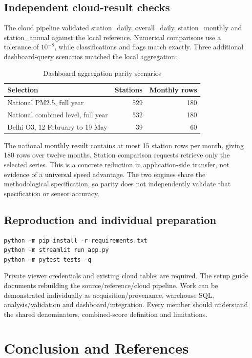 \documentclass[11pt,a4paper]{article}
\begin{document}
\subsection{Independent cloud-result checks}
The cloud pipeline validated station\_daily, overall\_daily, station\_monthly and station\_annual against the local reference. Numerical comparisons use a tolerance of $10^{-8}$, while classifications and flags match exactly. Three additional dashboard-query scenarios matched the local aggregation:

\begin{table}[H]\centering\caption{Dashboard aggregation parity scenarios}
\begin{tabularx}{\linewidth}{Yrr}\toprule
Selection & Stations & Monthly rows\\\midrule
National PM2.5, full year & 529 & 180\\
National combined level, full year & 532 & 180\\
Delhi O3, 12 February to 19 May & 39 & 60\\\bottomrule
\end{tabularx}\end{table}

The national monthly result contains at most 15 station rows per month, giving 180 rows over twelve months. Station comparison requests retrieve only the selected series. This is a concrete reduction in application-side transfer, not evidence of a universal speed advantage. The two engines share the methodological specification, so parity does not independently validate that specification or sensor accuracy.

\subsection{Reproduction and individual preparation}
\begin{lstlisting}
python -m pip install -r requirements.txt
python -m streamlit run app.py
python -m pytest tests -q
\end{lstlisting}
Private viewer credentials and existing cloud tables are required. The setup guide documents rebuilding the source/reference/cloud pipeline. Work can be demonstrated individually as acquisition/provenance, warehouse SQL, analysis/validation and dashboard/integration. Every member should understand the shared denominators, combined-score definition and limitations.

\newpage
\section{Conclusion and References}
\end{document}

